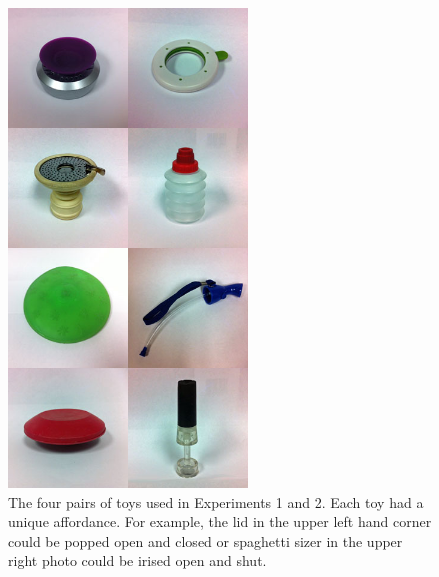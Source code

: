 \documentclass[man]{apa2}
\begin{document}
\begin{figure}
  \begin{center} 
    \includegraphics[width=2.5in]{figures/discourse_toys_images.jpg} 
    \caption{\label{fig:toys} The four pairs of toys used in Experiments 1 and 2. Each toy had a unique affordance. For example, the lid in the upper left hand corner could be popped open and closed or spaghetti sizer in the upper right photo could be irised open and shut.} 
  \end{center} 
\end{figure}
\end{document}

